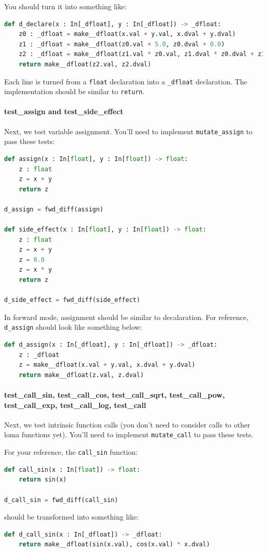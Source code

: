 You should turn it into something like:
\begin{lstlisting}[language=Python]
def d_declare(x : In[_dfloat], y : In[_dfloat]) -> _dfloat:
    z0 : _dfloat = make__dfloat(x.val + y.val, x.dval + y.dval)
    z1 : _dfloat = make__dfloat(z0.val + 5.0, z0.dval + 0.0)
    z2 : _dfloat = make__dfloat(z1.val * z0.val, z1.dval * z0.dval + z1.val * z0.dval)
    return make__dfloat(z2.val, z2.dval)
\end{lstlisting}
Each line is turned from a \lstinline{float} declaration into a \lstinline{_dfloat} declaration. The implementation should be similar to \lstinline{return}.

\paragraph{test_assign and test_side_effect} Next, we test variable assignment. You'll need to implement \lstinline{mutate_assign} to pass these tests:

\begin{lstlisting}[language=Python]
def assign(x : In[float], y : In[float]) -> float:
    z : float
    z = x + y
    return z

d_assign = fwd_diff(assign)

def side_effect(x : In[float], y : In[float]) -> float:
    z : float
    z = x + y
    z = 0.0
    z = x * y
    return z

d_side_effect = fwd_diff(side_effect)
\end{lstlisting}

In forward mode, assignment should be similar to decalaration. For reference, \lstinline{d_assign} should look like something below:
\begin{lstlisting}[language=Python]
def d_assign(x : In[_dfloat], y : In[_dfloat]) -> _dfloat:
    z : _dfloat 
    z = make__dfloat(x.val + y.val, x.dval + y.dval)
    return make__dfloat(z.val, z.dval)
\end{lstlisting}

\paragraph{test_call_sin, test_call_cos, test_call_sqrt, test_call_pow, test_call_exp, test_call_log, test_call} Next, we test intrinsic function calls (you don't need to consider calls to other loma functions yet). You'll need to implement \lstinline{mutate_call} to pass these tests.

For your reference, the \lstinline{call_sin} function:
\begin{lstlisting}[language=Python]
def call_sin(x : In[float]) -> float:
    return sin(x)

d_call_sin = fwd_diff(call_sin)
\end{lstlisting}
should be transformed into something like:
\begin{lstlisting}[language=Python]
def d_call_sin(x : In[_dfloat]) -> _dfloat:
    return make__dfloat(sin(x.val), cos(x.val) * x.dval)
\end{lstlisting}

